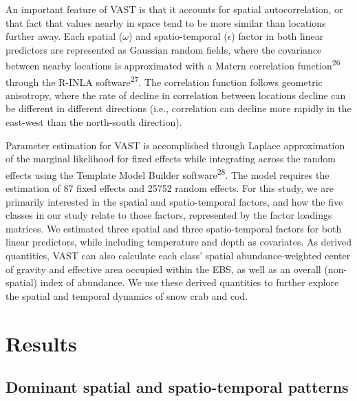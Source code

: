 \documentclass[11pt,]{article}
\begin{document}
An important feature of VAST is that it accounts for spatial autocorrelation, or that fact that values nearby in space tend to be more similar than locations further away. Each spatial (\(\omega\)) and spatio-temporal (\(\epsilon\)) factor in both linear predictors are represented as Gaussian random fields, where the covariance between nearby locations is approximated with a Matern correlation function\textsuperscript{26} through the R-INLA software\textsuperscript{27}. The correlation function follows geometric anisotropy, where the rate of decline in correlation between locations decline can be different in different directions (i.e., correlation can decline more rapidly in the east-west than the north-south direction).

Parameter estimation for VAST is accomplished through Laplace approximation of the marginal likelihood for fixed effects while integrating across the random effects using the Template Model Builder software\textsuperscript{28}. The model requires the estimation of 87 fixed effects and 25752 random effects. For this study, we are primarily interested in the spatial and spatio-temporal factors, and how the five classes in our study relate to those factors, represented by the factor loadings matrices. We estimated three spatial and three spatio-temporal factors for both linear predictors, while including temperature and depth as covariates. As derived quantities, VAST can also calculate each class' spatial abundance-weighted center of gravity and effective area occupied within the EBS, as well as an overall (non-spatial) index of abundance. We use these derived quantities to further explore the spatial and temporal dynamics of snow crab and cod.

\hypertarget{results}{%
\section{Results}\label{results}}

\hypertarget{dominant-spatial-and-spatio-temporal-patterns}{%
\subsection{Dominant spatial and spatio-temporal patterns}\label{dominant-spatial-and-spatio-temporal-patterns}}
\end{document}
